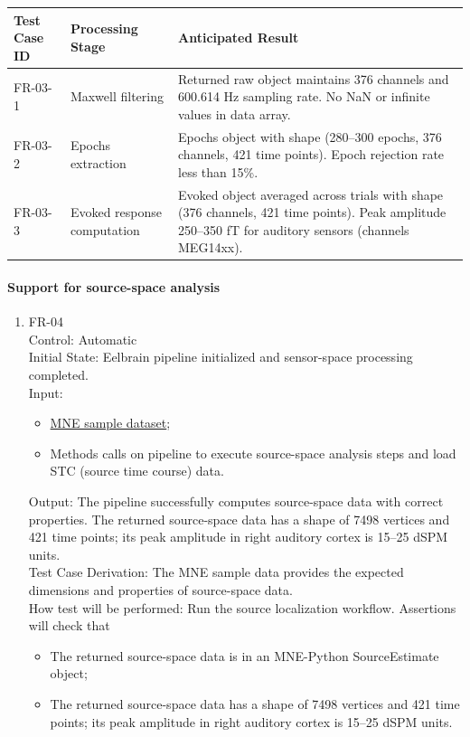\documentclass[12pt, titlepage]{article}
\begin{document}
\begin{tabularx}{\textwidth}{p{2.5cm}p{5cm}X}
\toprule 
    \textbf{Test Case ID} & \textbf{Processing Stage} & \textbf{Anticipated Result} \\
\midrule

    FR-03-1 & Maxwell filtering & Returned raw object maintains 376 channels and 600.614 Hz sampling rate. No NaN or infinite values in data array. \\

    FR-03-2 & Epochs extraction & Epochs object with shape (280--300 epochs, 376 channels, 421 time points). Epoch rejection rate less than 15\%. \\

    FR-03-3 & Evoked response computation & Evoked object averaged across trials with shape (376 channels, 421 time points). Peak amplitude 250--350 fT for auditory sensors (channels MEG14xx). \\
\bottomrule
\end{tabularx}


\paragraph{Support for source-space analysis}


\begin{enumerate}


\item{FR-04\\}
    Control: Automatic \\
    Initial State: Eelbrain pipeline initialized and sensor-space processing completed. \\
    Input:
        \begin{itemize}
            \item \href{https://mne.tools/stable/documentation/datasets.html#sample}{MNE sample dataset};
            \item Methods calls on pipeline to execute source-space analysis steps and load STC (source time course) data.
        \end{itemize}
    Output: The pipeline successfully computes source-space data with correct properties. The returned source-space data has a shape of 7498 vertices and 421 time points; its peak amplitude in right auditory cortex is 15--25 dSPM units. \\
    Test Case Derivation: The MNE sample data provides the expected dimensions and properties of source-space data. \\
    How test will be performed: Run the source localization workflow. Assertions will check that 
    \begin{itemize}
        \item The returned source-space data is in an MNE-Python SourceEstimate object;
        \item The returned source-space data has a shape of 7498 vertices and 421 time points; its peak amplitude in right auditory cortex is 15--25 dSPM units.
    \end{itemize}
    


\end{enumerate}
\end{document}
